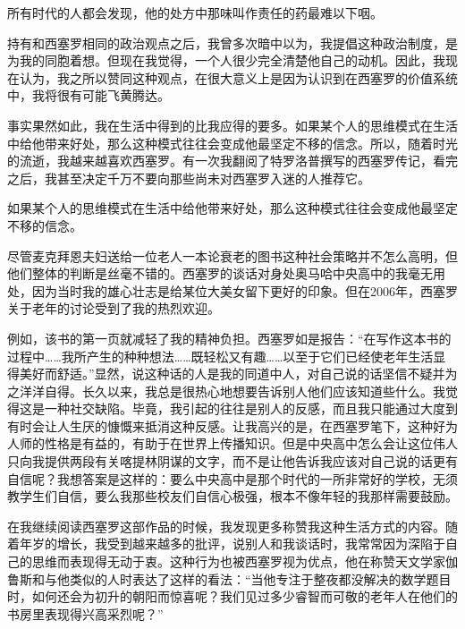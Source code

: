 \begin{WisdomBox}
\par

所有时代的人都会发现，他的处方中那味叫作责任的药最难以下咽。
\par
\end{WisdomBox}

持有和西塞罗相同的政治观点之后，我曾多次暗中以为，我提倡这种政治制度，是为我的同胞着想。但现在我觉得，一个人很少完全清楚他自己的动机。因此，我现在认为，我之所以赞同这种观点，在很大意义上是因为认识到在西塞罗的价值系统中，我将很有可能飞黄腾达。
\par

事实果然如此，我在生活中得到的比我应得的要多。如果某个人的思维模式在生活中给他带来好处，那么这种模式往往会变成他最坚定不移的信念。所以，随着时光的流逝，我越来越喜欢西塞罗。有一次我翻阅了特罗洛普撰写的西塞罗传记，看完之后，我甚至决定千万不要向那些尚未对西塞罗入迷的人推荐它。
\par

\begin{WisdomBox}
\par

如果某个人的思维模式在生活中给他带来好处，那么这种模式往往会变成他最坚定不移的信念。
\par
\end{WisdomBox}

尽管麦克拜恩夫妇送给一位老人一本论衰老的图书这种社会策略并不怎么高明，但他们整体的判断是丝毫不错的。西塞罗的谈话对身处奥马哈中央高中的我毫无用处，因为当时我的雄心壮志是给某位大美女留下更好的印象。但在2006年，西塞罗关于老年的讨论受到了我的热烈欢迎。
\par

例如，该书的第一页就减轻了我的精神负担。西塞罗如是报告：“在写作这本书的过程中……我所产生的种种想法……既轻松又有趣……以至于它们已经使老年生活显得美好而舒适。”显然，说这种话的人是我的同道中人，对自己说的话坚信不疑并为之洋洋自得。长久以来，我总是很热心地想要告诉别人他们应该知道些什么。我觉得这是一种社交缺陷。毕竟，我引起的往往是别人的反感，而且我只能通过大度到有时会让人生厌的慷慨来抵消这种反感。让我高兴的是，在西塞罗笔下，这种好为人师的性格是有益的，有助于在世界上传播知识。但是中央高中怎么会让这位伟人只向我提供两段有关喀提林阴谋的文字，而不是让他告诉我应该对自己说的话更有自信呢？我想答案是这样的：要么中央高中是那个时代的一所非常好的学校，无须教学生们自信，要么我那些校友们自信心极强，根本不像年轻的我那样需要鼓励。
\par

在我继续阅读西塞罗这部作品的时候，我发现更多称赞我这种生活方式的内容。随着年岁的增长，我受到越来越多的批评，说别人和我谈话时，我常常因为深陷于自己的思维而表现得无动于衷。这种行为也被西塞罗视为优点，他在称赞天文学家伽鲁斯和与他类似的人时表达了这样的看法：“当他专注于整夜都没解决的数学题目时，如何还会为初升的朝阳而惊喜呢？我们见过多少睿智而可敬的老年人在他们的书房里表现得兴高采烈呢？”
\par

